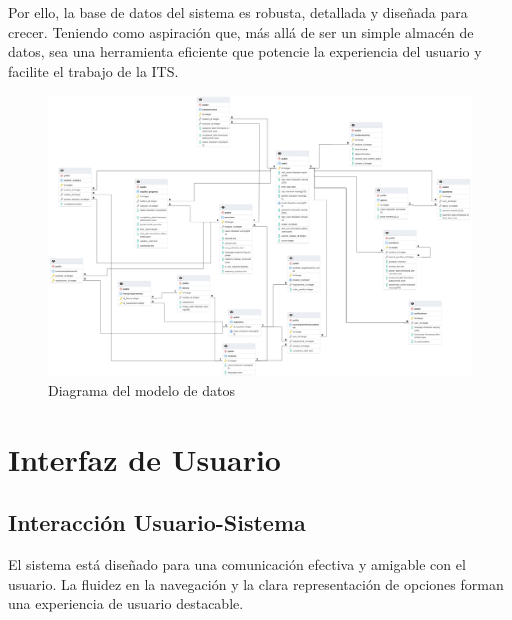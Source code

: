 Por ello, la base de datos del sistema es robusta, detallada y diseñada para crecer. Teniendo como aspiración que, más allá de ser un simple almacén de datos, sea una herramienta eficiente que potencie la experiencia del usuario y facilite el trabajo de la ITS.

\newpage

\begin{figure}[H]
    \centering
    \begin{sideways}
        \includegraphics[width=1.8\textwidth]{imagenes/er.png}
    \end{sideways}
    \caption{Diagrama del modelo de datos}
    \label{fig:modeladodedatos}
\end{figure}

\section{Interfaz de Usuario}


\subsection{Interacción Usuario-Sistema}

El sistema está diseñado para una comunicación efectiva y amigable con el usuario. La fluidez en la navegación y la clara representación de opciones forman una experiencia de usuario destacable.


